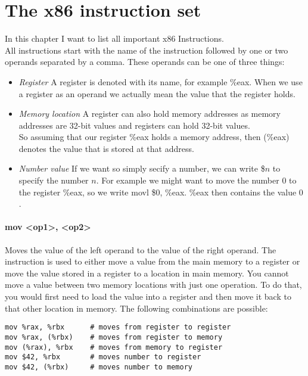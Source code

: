 \documentclass{scrreprt}
\begin{document}
\section{The x86 instruction set}
In this chapter I want to list all important x86 Instructions. \\
All instructions start with the name of the instruction followed by one or two operands separated by a comma. These operands can be one of three things: \\
\begin{itemize}
	\item \textit{Register}
		A register is denoted with its name, for example \%eax. When we use a register as an operand we actually mean the value that the register holds.
	\item \textit{Memory location}
		A register can also hold memory addresses as memory addresses are 32-bit values and registers can hold 32-bit values. \\
		So assuming that our register \%eax holds a memory address, then (\%eax) denotes the value that is stored at that address.
	\item \textit{Number value}
		If we want so simply secify a number, we can write \$$n$ to specify the number $n$. For example we might want to move the number $0$ to the register \%eax, so we write movl \$0, \%eax. \%eax then contains the value $0$.
\end{itemize}

\paragraph{mov <op1>, <op2>}
Moves the value of the left operand to the value of the right operand.
The instruction is used to either move a value from the main memory to a register or move the value stored in a register to a location in main memory. You cannot move a value between two memory locations with just one operation. To do that, you would first need to load the value into a register and then move it back to that other location in memory. The following combinations are possible: \\

\begin{lstlisting}
mov %rax, %rbx 		# moves from register to register
mov %rax, (%rbx) 	# moves from register to memory
mov (%rax), %rbx 	# moves from memory to register
mov $42, %rbx 		# moves number to register
mov $42, (%rbx) 	# moves number to memory
\end{lstlisting}
\end{document}
